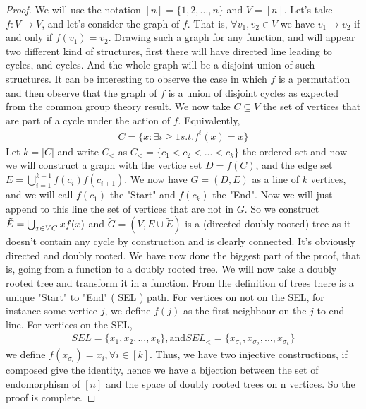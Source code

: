 \begin{proof}
We will use the notation $[n] = \{1, 2, ..., n\}$ and $V = [n]$.
Let's take $f:V \longrightarrow V$, and let's consider the graph of $f$. That is, $\forall v_1, v_2 \in V$ we have $v_1 \rightarrow v_2$ if and only if $f(v_1) = v_2$.
Drawing such a graph for any function, and will appear two different kind of structures, first there will have directed line leading to cycles, and cycles. And the whole graph will be a disjoint union of such structures. It can be interesting to observe the case in which $f$ is a permutation and then observe that the graph of $f$ is a union of disjoint cycles as expected from the common group theory result.
\newline
We now take $C \subseteq V$ the set of vertices that are part of a cycle under the action of $f$. Equivalently,
\begin{align*}
    C = \{ x : \exists i \geq 1 s. t. f^i(x) = x \}
\end{align*}
Let $k = |C|$ and write $C_<$ as $C_< = \{c_1 < c_2 <...<c_k\}$ the ordered set and now we will construct a graph with the vertice set $D = f(C)$, and the edge set $E = \bigcup_{i=1}^{k-1} f(c_i)f(c_{i+1})$. We now have $G=(D, E)$ as a line of $k$ vertices, and we will call $f(c_1)$ the "Start" and $f(c_k)$ the "End".
\newline
Now we will just append to this line the set of vertices that are not in $G$. So we construct $\tilde{E} = \bigcup_{x \in V\\C} x f(x)$ and $\tilde{G} = (V, E\cup\tilde{E})$ is a (directed doubly rooted) tree as it doesn't contain any cycle by construction and is clearly connected. It's obviously directed and  doubly rooted.
We have now done the biggest part of the proof, that is, going from a function to a doubly rooted tree.
\newline
We will now take a doubly rooted tree and transform it in a function. From the definition of trees there is a unique "Start" to "End" ( SEL ) path.
\newline
For vertices on not on the SEL, for instance some vertice $j$, we define $f(j)$ as the first neighbour on the $j$ to end line.
\newline
For vertices on the SEL, 
\begin{align}
    SEL = \{x_1, x_2, ..., x_k\}, \text{and} SEL_< = \{x_{\sigma_1}, x_{\sigma_2}, ..., x_{\sigma_k}\} 
\end{align}
we define $f(x_{\sigma_i}) = x_i, \forall i \in [k]$.
\newline
Thus, we have two injective constructions, if composed give the identity, hence we have a bijection between the set of endomorphism of $[n]$ and the space of doubly rooted trees on n vertices. So the proof is complete.
\end{proof}